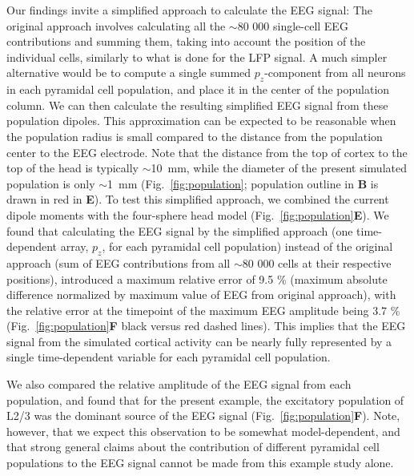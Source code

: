 \documentclass[preprint,10pt,authoryear]{elsarticle}
\newcommand{\newtxt}[1]{{\color{Red}#1}}
\begin{document}
Our findings invite a simplified approach to calculate the EEG signal: \newtxt{The original approach involves calculating all the $\sim$80 000 single-cell EEG contributions and summing them, taking into account the position of the individual cells, similarly to what is done for the LFP signal. A much simpler alternative would be to compute a single summed $p_z$-component from all neurons in each pyramidal cell population, and place it in the center of the population column. We can then calculate the resulting simplified EEG signal from these population dipoles.} This approximation can be expected to be reasonable when the population radius is small compared to the distance from the population center to the EEG electrode. Note that the distance from the top of cortex to the top of the head is typically $\sim$10~mm, while the \newtxt{diameter} of the present simulated population is only $\sim$\newtxt{1}~mm (Fig.~\ref{fig:population}; population outline in \textbf{B} is drawn in red in \textbf{E}).
\newtxt{To test this simplified approach, we combined the current dipole moments with the four-sphere head model (Fig.~\ref{fig:population}\textbf{E}). We found that calculating the EEG signal by the simplified approach (one time-dependent array, $p_z$, for each pyramidal cell population) instead of the original approach (sum of EEG contributions from all $\sim$80 000 cells at their respective positions), introduced a maximum relative error of 9.5 \% (maximum absolute difference normalized by maximum value of EEG from original approach), with the relative error at the timepoint of the maximum EEG amplitude being 3.7 \% (Fig.~\ref{fig:population}\textbf{F} black versus red dashed lines).} This implies that the EEG signal from the simulated cortical activity can be \newtxt{nearly} fully represented by a single time-dependent variable for each pyramidal cell population.


We also compared the relative amplitude of the EEG signal from each population, and found that for the present example, the excitatory population of L2/3 was the dominant source of the EEG signal (Fig.~\ref{fig:population}\textbf{F}). Note, however, that we expect this observation to be somewhat model-dependent, and that strong general claims about the contribution of different pyramidal cell populations to the EEG signal cannot be made from this example study alone.
\end{document}
